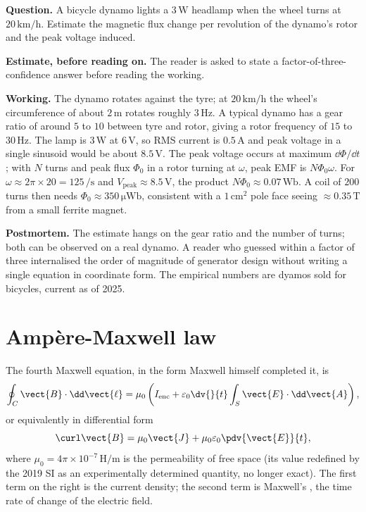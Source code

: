 \begin{estimation}
\textbf{Question.} A bicycle dynamo lights a $3\,\si{\watt}$ headlamp
when the wheel turns at $20\,\si{\kilo\meter\per\hour}$. Estimate the
magnetic flux change per revolution of the dynamo's rotor and the
peak voltage induced.

\textbf{Estimate, before reading on.} The reader is asked to state a
factor-of-three-confidence answer before reading the working.

\textbf{Working.} The dynamo rotates against the tyre; at $20\,\si{
\kilo\meter\per\hour}$ the wheel's circumference of about $2\,\si{
\meter}$ rotates roughly $3\,\si{\hertz}$. A typical dynamo has a
gear ratio of around $5$ to $10$ between tyre and rotor, giving a
rotor frequency of $15$ to $30\,\si{\hertz}$. The lamp is $3\,\si{
\watt}$ at $6\,\si{\volt}$, so RMS current is $0.5\,\si{\ampere}$ and
peak voltage in a single sinusoid would be about $8.5\,\si{\volt}$.
The peak voltage occurs at maximum $\dd\Phi/\dd t$; with $N$ turns
and peak flux $\Phi_{0}$ in a rotor turning at $\omega$, peak EMF is
$N\Phi_{0}\omega$. For $\omega \approx 2\pi\times 20 = 125\,\si{\per
\second}$ and $V_{\text{peak}} \approx 8.5\,\si{\volt}$, the product
$N\Phi_{0} \approx 0.07\,\si{\weber}$. A coil of $200$ turns then needs
$\Phi_{0} \approx 350\,\si{\micro\weber}$, consistent with a $1\,\si{
\centi\meter\squared}$ pole face seeing $\approx 0.35\,\si{\tesla}$
from a small ferrite magnet.

\textbf{Postmortem.} The estimate hangs on the gear ratio and the
number of turns; both can be observed on a real dynamo. A reader who
guessed within a factor of three internalised the order of magnitude
of generator design without writing a single equation in coordinate
form. The empirical numbers are dyamos sold for bicycles, current as
of 2025.
\end{estimation}

\section{Amp\`ere-Maxwell law}

The fourth Maxwell equation, in the form Maxwell himself completed it,
is
\[
\oint_{C} \vect{B}\cdot \dd\vect{\ell} = \mu_{0}\left( I_{\text{enc}}
+ \varepsilon_{0}\dv{}{t}\int_{S}\vect{E}\cdot \dd\vect{A}\right),
\]
or equivalently in differential form
\[
\curl \vect{B} = \mu_{0}\vect{J} + \mu_{0}\varepsilon_{0}\pdv{\vect{E}
}{t},
\]
where $\mu_{0} = 4\pi\times 10^{-7}\,\si{\henry\per\meter}$ is the
permeability of free space (its value redefined by the 2019 SI as
an experimentally determined quantity, no longer exact). The first
term on the right is the current density; the second term is Maxwell's
, the time rate of change of the
electric field.

